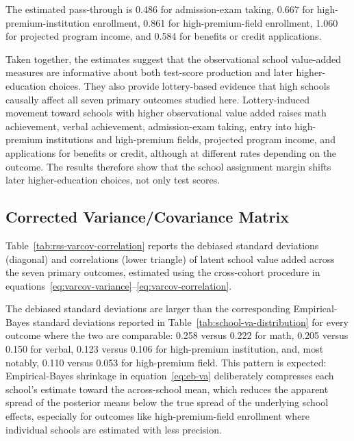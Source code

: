 \documentclass[a4paper, article, english, oneside, unknownkeysallowed, 12pt]{memoir}
\begin{document}
The estimated pass-through is 0.486 for admission-exam taking, 0.667 for high-premium-institution enrollment, 0.861 for high-premium-field enrollment, 1.060 for projected program income, and 0.584 for benefits or credit applications.

Taken together, the estimates suggest that the observational school value-added measures are informative about both test-score production and later higher-education choices.
They also provide lottery-based evidence that high schools causally affect all seven primary outcomes studied here.
Lottery-induced movement toward schools with higher observational value added raises math achievement, verbal achievement, admission-exam taking, entry into high-premium institutions and high-premium fields, projected program income, and applications for benefits or credit, although at different rates depending on the outcome.
The results therefore show that the school assignment margin shifts later higher-education choices, not only test scores.




\subsection{Corrected Variance/Covariance Matrix}

Table~\ref{tab:rss-varcov-correlation} reports the debiased standard deviations (diagonal) and correlations (lower triangle) of latent school value added across the seven primary outcomes, estimated using the cross-cohort procedure in equations~\eqref{eq:varcov-variance}--\eqref{eq:varcov-correlation}.



The debiased standard deviations are larger than the corresponding Empirical-Bayes standard deviations reported in Table~\ref{tab:school-va-distribution} for every outcome where the two are comparable: 0.258 versus 0.222 for math, 0.205 versus 0.150 for verbal, 0.123 versus 0.106 for high-premium institution, and, most notably, 0.110 versus 0.053 for high-premium field.
This pattern is expected: Empirical-Bayes shrinkage in equation~\eqref{eq:eb-va} deliberately compresses each school's estimate toward the across-school mean, which reduces the apparent spread of the posterior means below the true spread of the underlying school effects, especially for outcomes like high-premium-field enrollment where individual schools are estimated with less precision.
\end{document}

